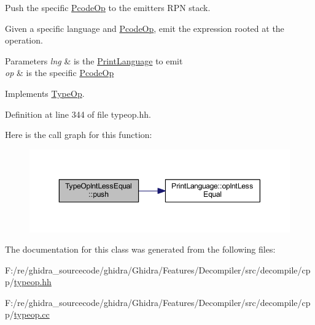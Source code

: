 Push the specific \mbox{\hyperlink{class_pcode_op}{Pcode\+Op}} to the emitter\textquotesingle{}s R\+PN stack. 

Given a specific language and \mbox{\hyperlink{class_pcode_op}{Pcode\+Op}}, emit the expression rooted at the operation. 
\begin{DoxyParams}{Parameters}
{\em lng} & is the \mbox{\hyperlink{class_print_language}{Print\+Language}} to emit \\
\hline
{\em op} & is the specific \mbox{\hyperlink{class_pcode_op}{Pcode\+Op}} \\
\hline
\end{DoxyParams}


Implements \mbox{\hyperlink{class_type_op_ac9c9544203ed74dabe6ac662b653b2af}{Type\+Op}}.



Definition at line 344 of file typeop.\+hh.

Here is the call graph for this function\+:
\nopagebreak
\begin{figure}[H]
\begin{center}
\leavevmode
\includegraphics[width=350pt]{class_type_op_int_less_equal_a9ddf23cf8017278798cb8570459cf544_cgraph}
\end{center}
\end{figure}


The documentation for this class was generated from the following files\+:\begin{DoxyCompactItemize}
\item 
F\+:/re/ghidra\+\_\+sourcecode/ghidra/\+Ghidra/\+Features/\+Decompiler/src/decompile/cpp/\mbox{\hyperlink{typeop_8hh}{typeop.\+hh}}\item 
F\+:/re/ghidra\+\_\+sourcecode/ghidra/\+Ghidra/\+Features/\+Decompiler/src/decompile/cpp/\mbox{\hyperlink{typeop_8cc}{typeop.\+cc}}\end{DoxyCompactItemize}
